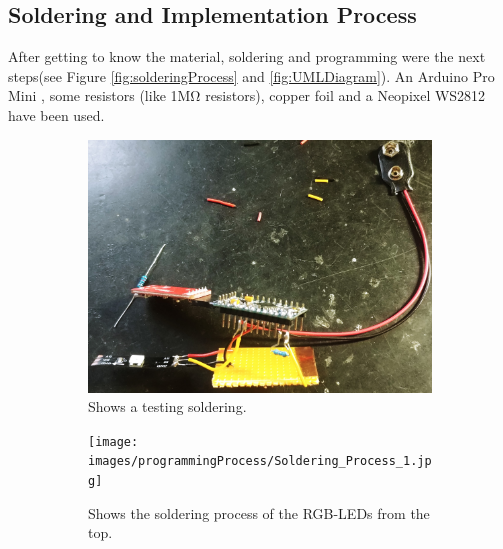 \documentclass[04_projectProcess.tex]{subfiles}
\begin{document}
    \subsection{Soldering and Implementation Process}
    \begin{flushleft}
        After getting to know the material, soldering and programming were the next steps(see Figure \ref{fig:solderingProcess} and \ref{fig:UMLDiagram}).
        An Arduino Pro Mini \cite{arduinoProMini}, some resistors (like 
        1M\si{\ohm} resistors), copper foil and a Neopixel WS2812 have been used. \\      
        
        \begin{figure}[H]
            \centering
            \begin{subfigure}{.45\textwidth}
                \centering
                \includegraphics[width=0.8\linewidth]{images/programmingProcess/solderingProcess.jpg}
                \caption{Shows a testing soldering.}
                \label{fig:solderingProcess_0}
                \vspace{6mm}
            \end{subfigure}
            \begin{subfigure}{.45\textwidth}
                \centering
                \texttt{[image: images/programmingProcess/Soldering\_Process\_1.jpg]}
                \caption{Shows the soldering process of the RGB-LEDs from the top.}
                \label{fig:solderingProcess_1}
                \vspace{6mm}
            \end{subfigure}
            \hspace{1mm}
            \begin{subfigure}{.45\textwidth}
                \centering

\end{subfigure}
\end{figure}
\end{flushleft}
\end{document}
